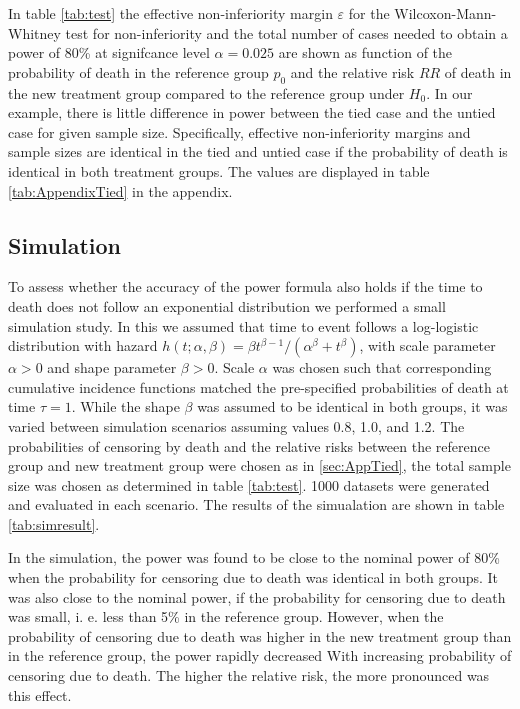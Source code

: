 \documentclass[bimj,fleqn]{w-art}\usepackage[]{graphicx}\usepackage[]{color}
\theoremstyle{plain}
\theoremstyle{definition}
\begin{document}
In table \ref{tab:test} the effective non-inferiority margin $\varepsilon$ for the
Wilcoxon-Mann-Whitney test for non-inferiority and the total number of cases
needed to obtain a power of 80\% at signifcance level $\alpha =0.025$ are
shown as function of the probability of death in the reference group $p_0$ and
the relative risk $RR$ of death in the new treatment group compared to the
reference group under $H_0$.
In our example, there is little difference in power between the tied case
and the untied case for given sample size. Specifically, effective
non-inferiority margins and sample sizes are identical in the tied and untied
case if the probability of death is identical in both treatment groups. The
values are  displayed in table \ref{tab:AppendixTied} in the appendix.

\subsection{Simulation}
\label{sec:Sim}

To assess whether the accuracy of the power formula also holds if the time to
death does not follow an exponential distribution we performed a small simulation
study. In this we assumed that time to event follows a log-logistic distribution
with hazard $h(t; \alpha, \beta) = \beta t^{\beta - 1} / (\alpha^{\beta} + t^{\beta})$,
with scale parameter $\alpha > 0 $ and shape parameter $\beta > 0$. Scale $\alpha$ was
chosen such that corresponding cumulative incidence functions matched the
pre-specified probabilities of death at time $\tau = 1$. While the shape $\beta$
was assumed to be identical in both groups, it was varied between simulation
scenarios assuming values 0.8, 1.0, and 1.2.
The probabilities of censoring by death and the relative risks between the
reference group and new treatment group were chosen as in \ref{sec:AppTied}, the
total sample size was chosen as determined in table \ref{tab:test}. 1000 datasets
were generated and evaluated in each scenario. The results of the simualation
are shown in table \ref{tab:simresult}.

In the simulation, the power was found to be close to the nominal power of 80\%
when the probability for censoring due to death was identical in both groups.
It was also close to the nominal power, if the probability for censoring due to
death was small, i. e. less than 5\% in the reference group. However, when the
probability of censoring due to death was higher in the new treatment group than
in the reference group, the power rapidly decreased With increasing probability
of censoring due to death. The higher the relative risk, the more pronounced was
this effect.
\end{document}
